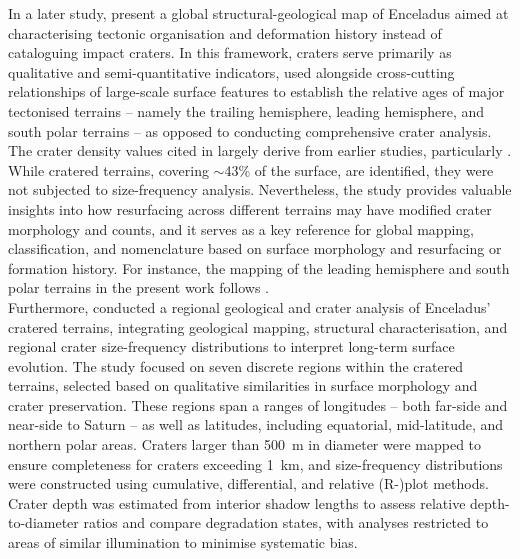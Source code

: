 \documentclass[preprint,11pt,3p,times,authoryear]{elsarticle}
\begin{document}
In a later study, \citet{CrowWillard2015} present a global structural-geological map of Enceladus aimed at characterising tectonic organisation and deformation history instead of  cataloguing impact craters. In this framework, craters serve primarily as qualitative and semi-quantitative indicators, used alongside cross-cutting relationships of large-scale surface features to establish the relative ages of major tectonised terrains -- namely the trailing hemisphere, leading hemisphere, and south polar terrains -- as opposed to conducting comprehensive crater analysis. The crater density values cited in \citet{CrowWillard2015} largely derive from earlier studies, particularly \citet{Kirchoff2009}. While cratered terrains, covering $\sim$43\% of the surface, are identified, they were not subjected to size-frequency analysis. Nevertheless, the study provides valuable insights into how resurfacing across different terrains may have modified crater morphology and counts, and it serves as a key reference for global mapping, classification, and nomenclature based on surface morphology and resurfacing or formation history. For instance, the mapping of the leading hemisphere and south polar terrains in the present work follows \citet{CrowWillard2015}.\\

Furthermore, \citet{Kinczyk2024} conducted a regional geological and crater analysis of Enceladus’ cratered terrains, integrating geological mapping, structural characterisation, and regional crater size-frequency distributions to interpret long-term surface evolution. The study focused on seven discrete regions within the cratered terrains, selected based on qualitative similarities in surface morphology and crater preservation. These regions span a ranges of longitudes -- both far-side and near-side to Saturn -- as well as latitudes, including equatorial, mid-latitude, and northern polar areas. Craters larger than 500~m in diameter were mapped to ensure completeness for craters exceeding 1~km, and size-frequency distributions were constructed using cumulative, differential, and relative (R-)plot methods. Crater depth was estimated from interior shadow lengths to assess relative depth-to-diameter ratios and compare degradation states, with analyses restricted to areas of similar illumination to minimise systematic bias.\\
\end{document}
